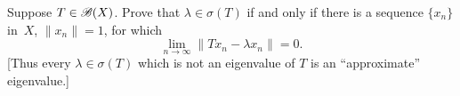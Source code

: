 \begin{enumerate}
\begin{excopy}
Suppose \(T \in \mathscr{B}(X)\). Prove that \(\lambda \in \sigma(T)\) if and only if
there is a sequence \(\{x_n\}\) in~$X$, \(\|x_n\|=1\), for which 
\begin{equation*}
\lim_{n\to\infty} \|T x_n - \lambda x_n\| = 0.
\end{equation*}
[Thus every \(\lambda \in \sigma(T)\) which is not an eigenvalue of $T$
is an ``approximate'' eigenvalue.]
\end{excopy}

\unfinished

\end{enumerate}
